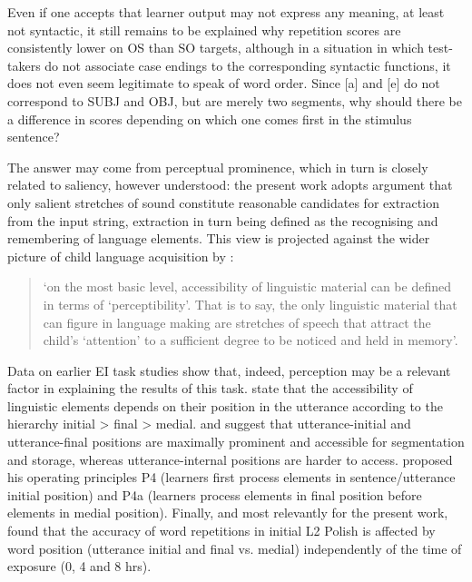 Even if one accepts that learner output may not express any meaning, at least not syntactic, it still remains to be explained why repetition scores are consistently lower on OS than SO targets, although in a situation in which test-takers do not associate case endings to the corresponding syntactic functions, it does not even seem legitimate to speak of word order. Since [a] and [e] do not correspond to SUBJ and OBJ, but are merely two segments, why should there be a difference in scores depending on which one comes first in the stimulus sentence?

The answer may come from perceptual prominence, which in turn is closely related to saliency, however understood: the present work adopts  argument that only salient stretches of sound constitute reasonable candidates for extraction from the input string, extraction in turn being defined as the recognising and remembering of language elements. This view is projected against the wider picture of child language acquisition by \citet[1164]{Slobin1985}: 

\begin{quote}
‘on the most basic level, accessibility of linguistic material can be defined in terms of ‘perceptibility’. That is to say, the only linguistic material that can figure in language making are stretches of speech that attract the child’s ‘attention’ to a sufficient degree to be noticed and held in memory’.
\end{quote}

Data on earlier EI task studies show that, indeed, perception may be a relevant factor in explaining the results of this task. \citet{GallimoreTharp1981} state that the accessibility of linguistic elements depends on their position in the utterance according to the hierarchy initial > final > medial. \citet{Peters1985} and \citet[1166]{Slobin1985} suggest that utterance-initial and utterance-final positions are maximally prominent and accessible for segmentation and storage, whereas utterance-internal positions are harder to access. \citet[300]{VanPatten2000} proposed his operating principles P4 (learners first process elements in sentence/utterance initial position) and P4a (learners process elements in final position before elements in medial position). Finally, and most relevantly for the present work, \citet[151]{Rast2008} found that the accuracy of word repetitions in initial L2 Polish is affected by word position (utterance initial and final vs. medial) independently of the time of exposure (0, 4 and 8 hrs). 

